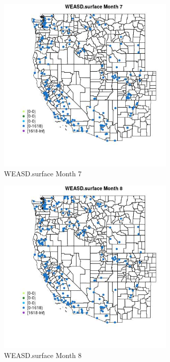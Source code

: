 \begin{figure} 
\centering  
\includegraphics[width=0.77\textwidth]{Code_Outputs/Report_ML_input_PM25_Step4_part_e_de_duplicated_aveswNAs_MapObsMo7WEASDsurface.jpg} 
\caption{\label{fig:Report_ML_input_PM25_Step4_part_e_de_duplicated_aveswNAsMapObsMo7WEASDsurface}WEASD.surface Month 7} 
\end{figure} 
 

\begin{figure} 
\centering  
\includegraphics[width=0.77\textwidth]{Code_Outputs/Report_ML_input_PM25_Step4_part_e_de_duplicated_aveswNAs_MapObsMo8WEASDsurface.jpg} 
\caption{\label{fig:Report_ML_input_PM25_Step4_part_e_de_duplicated_aveswNAsMapObsMo8WEASDsurface}WEASD.surface Month 8} 
\end{figure} 
 

